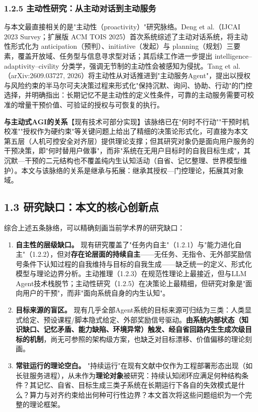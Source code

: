 \documentclass[11pt,a4paper]{ctexart}
\begin{document}
\subsubsection{1.2.5 主动性研究：从主动对话到主动服务}

与本文最直接相关的是"主动性（proactivity）"研究脉络。Deng et al.（IJCAI 2023 Survey；扩展版 ACM TOIS 2025）首次系统综述了主动对话系统，将主动性形式化为 anticipation（预判）、initiative（发起）与 planning（规划）三要素，覆盖开放域、任务型与信息寻求型对话；其后续工作进一步提出 intelligence--adaptivity--civility 分类学，强调无节制的主动性会被感知为侵扰。Tang et al.（arXiv:2609.03727, 2026）将主动性从对话推进到"主动服务Agent"，提出以授权与风险约束的半马尔可夫决策过程来形式化"保持沉默、询问、协助、行动"的门控选择，并明确指出：长期记忆不是主动性的定义性条件，可靠的主动服务需要可校准的增量干预价值、可验证的授权与可恢复的执行。

\textbf{与主动式AGI的关系}【现有技术可部分实现】该脉络已在"何时不行动""干预时机校准""授权作为硬约束"等关键问题上给出了精细的决策论形式化，可直接为本文第五层（人机可控安全对齐层）提供理论支撑；但其研究对象仍是面向用户服务的干预决策，即"何时替用户做事"，而非"系统在无用户目标时的自我目标生成"，其沉默—干预的二元结构也不覆盖纯内生认知活动（自省、记忆整理、世界模型维护）。本文与该脉络的关系是继承与拓展：继承其授权—门控理论，拓展其对象域。

\subsection{1.3 研究缺口：本文的核心创新点}

综合上述五条脉络，可以精确刻画当前学术界的研究缺口：

\begin{enumerate}

  \item \textbf{自主性的层级缺口。} 现有研究覆盖了"任务内自主"（1.2.1）与"能力进化自主"（1.2.2），但对\textbf{存在论层面的持续自主}——无任务、无指令、无外部奖励信号条件下认知过程的自我维持与目标的自我生成——缺乏统一的定义、形式化模型与理论边界分析。主动推理（1.2.3）在规范性理论上最接近，但与LLM Agent技术栈脱节；主动性研究（1.2.5）在决策论上最精细，但研究对象是"面向用户的干预"，而非"面向系统自身的内生认知"。

  \item \textbf{目标来源的盲区。} 现有几乎全部Agent系统的目标来源可归结为三类：人类显式给定、预设课程/脚本隐式给定、外部奖励信号驱动。\textbf{由系统内部状态（知识缺口、记忆矛盾、能力缺陷、环境异常）触发、经自省回路内生生成次级目标的机制}，尚无可参照的架构级方案，也缺乏对目标漂移、价值偏移的理论刻画。

  \item \textbf{常驻运行的理论空白。} "持续运行"在现有文献中仅作为工程部署形态出现（如长驻服务进程），从未作为\textbf{理论对象}被研究：持续认知闭环应满足何种结构条件？其记忆、自省、目标生成三类子系统在长期运行下各自的失效模式是什么？算力与对齐约束给出何种可行性边界？本文首次将这些问题组织为一个完整的理论框架。

\end{enumerate}
\end{document}
